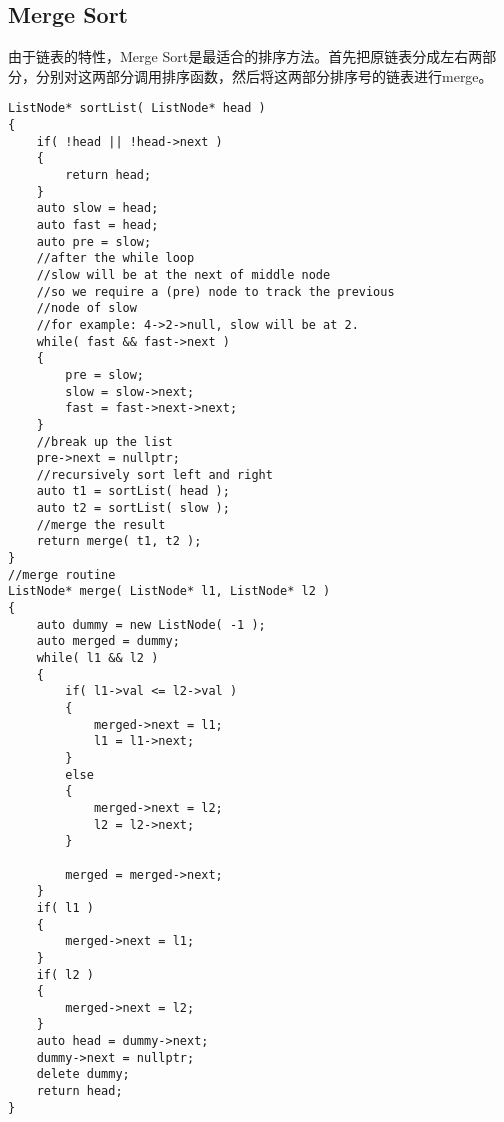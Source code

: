 \subsection{Merge Sort}
由于链表的特性，Merge Sort是最适合的排序方法。首先把原链表分成左右两部分，分别对这两部分调用排序函数，然后将这两部分排序号的链表进行merge。

\setcounter{lstlisting}{0}
\begin{lstlisting}[style=customc, caption={Merge Sort}]
ListNode* sortList( ListNode* head )
{
    if( !head || !head->next )
    {
        return head;
    }
    auto slow = head;
    auto fast = head;
    auto pre = slow;
    //after the while loop
    //slow will be at the next of middle node
    //so we require a (pre) node to track the previous
    //node of slow
    //for example: 4->2->null, slow will be at 2.
    while( fast && fast->next )
    {
        pre = slow;
        slow = slow->next;
        fast = fast->next->next;
    }
    //break up the list
    pre->next = nullptr;
    //recursively sort left and right
    auto t1 = sortList( head );
    auto t2 = sortList( slow );
    //merge the result
    return merge( t1, t2 );
}
//merge routine
ListNode* merge( ListNode* l1, ListNode* l2 )
{
    auto dummy = new ListNode( -1 );
    auto merged = dummy;
    while( l1 && l2 )
    {
        if( l1->val <= l2->val )
        {
            merged->next = l1;
            l1 = l1->next;
        }
        else
        {
            merged->next = l2;
            l2 = l2->next;
        }

        merged = merged->next;
    }
    if( l1 )
    {
        merged->next = l1;
    }
    if( l2 )
    {
        merged->next = l2;
    }
    auto head = dummy->next;
    dummy->next = nullptr;
    delete dummy;
    return head;
}
\end{lstlisting}



